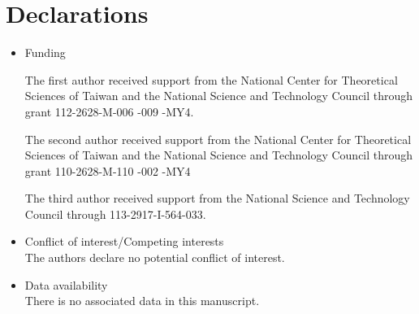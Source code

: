 \documentclass[sn-mathphys-num]{sn-jnl}%
\theoremstyle{thmstyleone}%
\theoremstyle{thmstyletwo}%
\theoremstyle{thmstylethree}%
\begin{document}
\section*{Declarations}

\begin{itemize}
\item Funding

The first author received support from the National Center for Theoretical Sciences of Taiwan and
the National Science and Technology Council through grant 112-2628-M-006 -009 -MY4.

The second author received support from the National Center for Theoretical Sciences of Taiwan and
the National Science and Technology Council through grant 110-2628-M-110 -002 -MY4

The third author received support from
the National Science and Technology Council through 113-2917-I-564-033.


\item Conflict of interest/Competing interests\\
The authors declare no potential conflict of interest.

\item Data availability\\
There is no associated data in this manuscript.
\end{itemize}

\noindent

\end{document}
